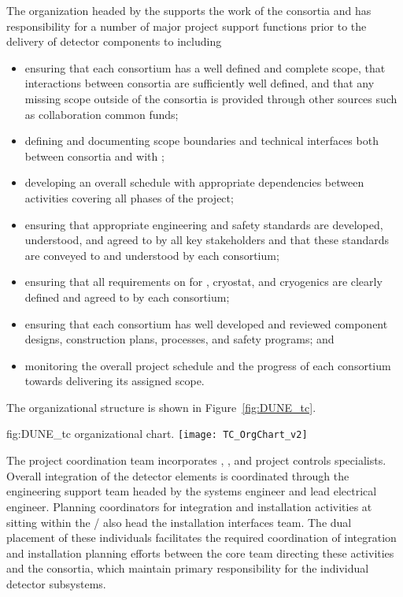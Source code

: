 The  organization headed by the  supports the work of 
the consortia and has responsibility for a number of major project 
support functions prior to the delivery of detector components to 
 including
\begin{itemize}
\item ensuring that each consortium has a well defined and complete
  scope, that interactions between consortia are sufficiently 
  well defined, and that any missing scope outside of the 
  consortia is provided through other sources such as collaboration
  common funds;
\item defining and documenting scope boundaries and technical 
  interfaces both between consortia and with ;  
\item developing an overall schedule with appropriate dependencies
  between activities covering all phases of the project; 
\item ensuring that appropriate engineering and safety standards 
  are developed, understood, and agreed to by all key stakeholders 
  and that these standards are conveyed to and understood by each
  consortium;
\item ensuring that all  requirements on  
  for , cryostat, and cryogenics are clearly defined and 
  agreed to by each consortium;
\item ensuring that each consortium has well developed and reviewed
  component designs, construction plans,  processes, and 
  safety programs; and
\item monitoring the overall project schedule and the progress of 
  each consortium towards delivering its assigned scope. 
\end{itemize}
The   organizational structure is shown 
in Figure~\ref{fig:DUNE_tc}. 
\begin{dunefigure}{fig:DUNE_tc}
  {  organizational chart.}
  \texttt{[image: TC\_OrgChart\_v2]}
\end{dunefigure}

The  project coordination team incorporates , 
, and project controls specialists.  Overall integration 
of the detector elements is coordinated through the  
engineering support team headed by the  systems 
engineer and lead  electrical engineer.  Planning 
coordinators for integration and installation activities at 
 sitting within the /  also head the  installation interfaces team.  
The dual placement of these individuals facilitates the required 
coordination of integration and installation planning efforts between 
the core team directing these activities and the  
consortia, which maintain primary responsibility for the individual 
detector subsystems. 

